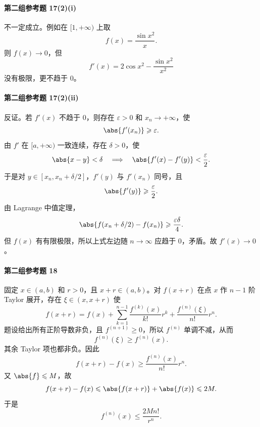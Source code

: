 \paragraph{第二组参考题 17(2)(i)}
\begin{xsolution}
不一定成立。例如在 $[1,+\infty)$ 上取
\[
  f(x)=\frac{\sin x^2}{x}.
\]
则 $f(x)\to0$，但
\[
  f'(x)=2\cos x^2-\frac{\sin x^2}{x^2}
\]
没有极限，更不趋于 $0$。
\end{xsolution}

\paragraph{第二组参考题 17(2)(ii)}
\begin{xsolution}
反证。若 $f'(x)$ 不趋于 $0$，则存在 $\varepsilon>0$ 和 $x_n\to+\infty$，使
\[
  \abs{f'(x_n)}\geqslant\varepsilon.
\]
由 $f'$ 在 $[a,+\infty)$ 一致连续，存在 $\delta>0$，使
\[
  \abs{x-y}<\delta
  \quad\Longrightarrow\quad
  \abs{f'(x)-f'(y)}<\frac\varepsilon2.
\]
于是对 $y\in[x_n,x_n+\delta/2]$，$f'(y)$ 与 $f'(x_n)$ 同号，且
\[
  \abs{f'(y)}\geqslant\frac\varepsilon2.
\]
由 Lagrange 中值定理，
\[
  \abs{f(x_n+\delta/2)-f(x_n)}
  \geqslant\frac{\varepsilon\delta}{4}.
\]
但 $f(x)$ 有有限极限，所以上式左边随 $n\to\infty$ 应趋于 $0$，矛盾。故 $f'(x)\to0$。
\end{xsolution}

\paragraph{第二组参考题 18}
\begin{xsolution}
固定 $x\in(a,b)$ 和 $r>0$，且 $x+r\in(a,b)$。对 $f(x+r)$ 在点 $x$ 作 $n-1$ 阶 Taylor 展开，存在 $\xi\in(x,x+r)$ 使
\[
  f(x+r)
  =f(x)+\sum_{k=1}^{n-1}\frac{f^{(k)}(x)}{k!}r^k
   +\frac{f^{(n)}(\xi)}{n!}r^n.
\]
题设给出所有正阶导数非负，且 $f^{(n+1)}\geqslant0$，所以 $f^{(n)}$ 单调不减，从而
\[
  f^{(n)}(\xi)\geqslant f^{(n)}(x).
\]
其余 Taylor 项也都非负。因此
\[
  f(x+r)-f(x)\geqslant\frac{f^{(n)}(x)}{n!}r^n.
\]
又 $\abs{f}\leqslant M$，故
\[
  f(x+r)-f(x)\leqslant\abs{f(x+r)}+\abs{f(x)}\leqslant2M.
\]
于是
\[
  f^{(n)}(x)\leqslant\frac{2Mn!}{r^n}.
\]
\end{xsolution}

